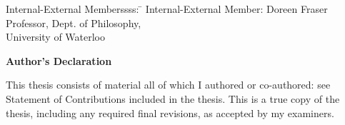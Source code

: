   \noindent
\begin{tabbing}
Internal-External Memberssss: \=  \kill %
Internal-External Member: \> Doreen Fraser \\
\> Professor, Dept. of Philosophy, \\ \>University of Waterloo \\
\end{tabbing}
  \bigskip
  

\cleardoublepage
{}    %











 \begin{center}\textbf{Author's Declaration}\end{center}

 \noindent
This thesis consists of material all of which I authored or co-authored: see Statement of Contributions included in the thesis. This is a true copy of the thesis, including any required final revisions, as accepted by my examiners.
 
 \noindent  
  \bigskip
  
